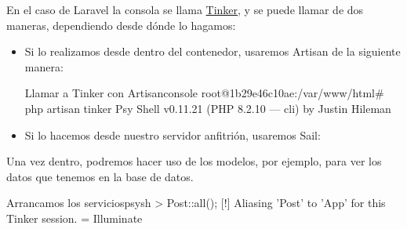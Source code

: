 En el caso de Laravel la consola se llama \href{https://laravel.com/docs/10.x/artisan#tinker}{Tinker}, y se puede llamar de dos maneras, dependiendo desde dónde lo hagamos:
\begin{itemize}
    \item Si lo realizamos desde dentro del contenedor, usaremos Artisan de la siguiente manera:
\begin{mycode}{Llamar a Tinker con Artisan}{console}{}
root@1b29e46c10ae:/var/www/html# php artisan tinker
Psy Shell v0.11.21 (PHP 8.2.10 — cli) by Justin Hileman
\end{mycode}

    \item Si lo hacemos desde nuestro servidor anfitrión, usaremos Sail:
\end{itemize}

Una vez dentro, podremos hacer uso de los modelos, por ejemplo, para ver los datos que tenemos en la base de datos.

\begin{mycode}{Arrancamos los servicios}{psysh}{}
> Post::all();
[!] Aliasing 'Post' to 'App\Models\Post' for this Tinker session.
= Illuminate\Database\Eloquent{}
\end{mycode}